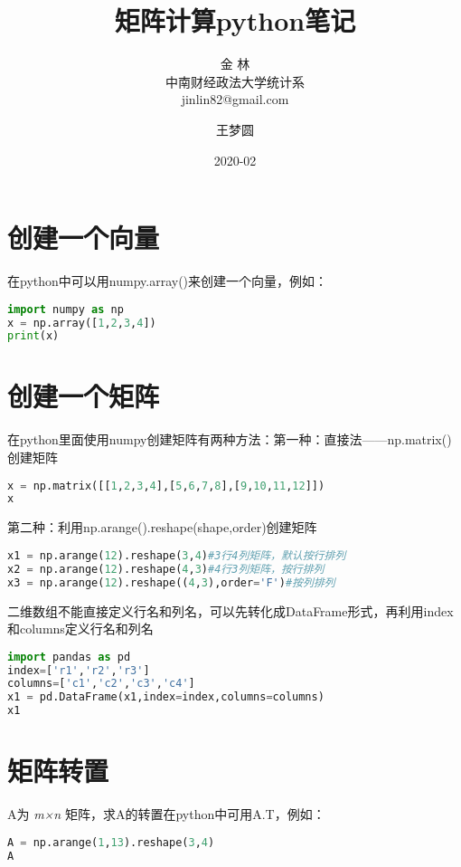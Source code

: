 \documentclass[UTF8,a4paper,12pt]{ctexart}  %
\author{\CJKfamily{kai} 金 \enspace 林 \\ \CJKfamily{kai} 中南财经政法大学统计系 \\ jinlin82@gmail.com}
\title{\LARGE\textbf{矩阵计算python笔记}}
\author{王梦圆}
\date{2020-02}
\begin{document}
\maketitle

\section{创建一个向量}

在python中可以用numpy.array()来创建一个向量，例如：

\begin{lstlisting}[language=Python]
import numpy as np
x = np.array([1,2,3,4])
print(x)
\end{lstlisting}

\section{创建一个矩阵}

在python里面使用numpy创建矩阵有两种方法：第一种：直接法------np.matrix()创建矩阵

\begin{lstlisting}[language=Python]
x = np.matrix([[1,2,3,4],[5,6,7,8],[9,10,11,12]])
x
\end{lstlisting}

第二种：利用np.arange().reshape(shape,order)创建矩阵

\begin{lstlisting}[language=Python]
x1 = np.arange(12).reshape(3,4)#3行4列矩阵，默认按行排列
x2 = np.arange(12).reshape(4,3)#4行3列矩阵，按行排列
x3 = np.arange(12).reshape((4,3),order='F')#按列排列
\end{lstlisting}

二维数组不能直接定义行名和列名，可以先转化成DataFrame形式，再利用index和columns定义行名和列名

\begin{lstlisting}[language=Python]
import pandas as pd
index=['r1','r2','r3']
columns=['c1','c2','c3','c4']
x1 = pd.DataFrame(x1,index=index,columns=columns)
x1
\end{lstlisting}

\section{矩阵转置}

A为 \emph{m×n} 矩阵，求A的转置在python中可用A.T，例如：

\begin{lstlisting}[language=Python]
A = np.arange(1,13).reshape(3,4)
A
\end{lstlisting}
\end{document}
